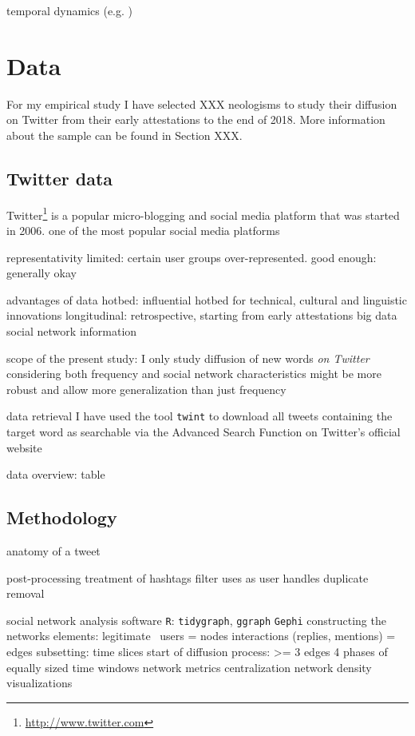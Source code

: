 \documentclass[draft, a4paper, abstract=on]{scrartcl}
\newcommand{\sw}[1]{\texttt{#1}}
\begin{document}
  temporal dynamics (e.g. )

\section{Data}

For my empirical study I have selected XXX neologisms to study their diffusion on Twitter from their early attestations to the end of 2018. More information about the sample can be found in Section XXX.

  \subsection{Twitter data}

  Twitter\footnote{\url{http://www.twitter.com}} is a popular micro-blogging and social media platform that was started in 2006.
  one of the most popular social media platforms

  representativity
  limited: certain user groups over-represented.
  good enough: generally okay \parencite{Grieve2019MappingLexical}

  advantages of data
  hotbed: influential hotbed for technical, cultural and linguistic innovations
  longitudinal: retrospective, starting from early attestations
  big data
  social network information

  scope of the present study:
  I only study diffusion of new words \emph{on Twitter}
  considering both frequency and social network characteristics might be more robust and allow more generalization than just frequency

  data retrieval
  I have used the tool \sw{twint}
  to download all tweets containing the target word
  as searchable via the Advanced Search Function on Twitter's official website

  data overview: table

  \subsection{Methodology}

  anatomy of a tweet

  post-processing
  treatment of hashtags
  filter uses as user handles
  duplicate removal

  social network analysis
  software
  \sw{R}: \sw{tidygraph}, \sw{ggraph}
  \sw{Gephi}
  constructing the networks
  elements: legitimate~\parencite{Goel2016SocialDynamics}
  users = nodes
  interactions (replies, mentions) = edges
  subsetting: time slices
  start of diffusion process: >= 3 edges
  4 phases of equally sized time windows
  network metrics
  centralization
  network density
  visualizations
\end{document}
